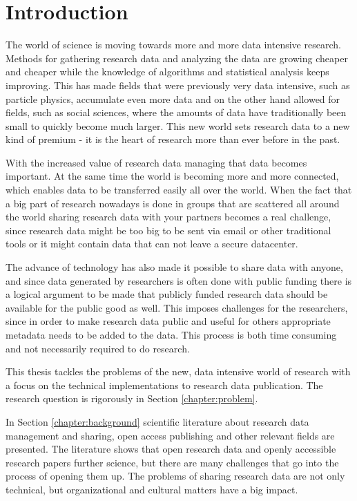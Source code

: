 \chapter{Introduction}
\label{chapter:intro}

The world of science is moving towards more and more data intensive research.
Methods for gathering research data and analyzing the data are growing
cheaper and cheaper while the knowledge of algorithms and statistical analysis
keeps improving. This has made fields that were previously very data intensive,
such as particle physics, accumulate even more data and on the other hand
allowed for fields, such as social sciences, where the amounts of data have
traditionally been small to quickly become much larger. This new world sets
research data to a new kind of premium - it is the heart of research more
than ever before in the past.

With the increased value of research data managing that data becomes important.
At the same time the world is becoming more and more connected, which enables
data to be transferred easily all over the world. When the fact that a big
part of research nowadays is done in groups that are scattered all around the
world sharing research data with your partners becomes a real challenge, since
research data might be too big to be sent via email or other traditional tools
or it might contain data that can not leave a secure datacenter.

The advance of technology has also made it possible to share data with anyone,
and since data generated by researchers is often done with public funding there
is a logical argument to be made that publicly funded research data should be
available for the public good as well. This imposes challenges for the
researchers, since in order to make research data public and useful for others
appropriate metadata needs to be added to the data. This process is both
time consuming and not necessarily required to do research.

This thesis tackles the problems of the new, data intensive world of research
with a focus on the technical implementations to research data publication.
The research question is rigorously in Section \ref{chapter:problem}.

In Section \ref{chapter:background} scientific literature about research data
management and sharing, open access publishing and other relevant fields are
presented. The literature shows that open research data and openly accessible
research papers further science, but there are many challenges that go into
the process of opening them up. The problems of sharing research data are not
only technical, but organizational and cultural matters have a big impact.

